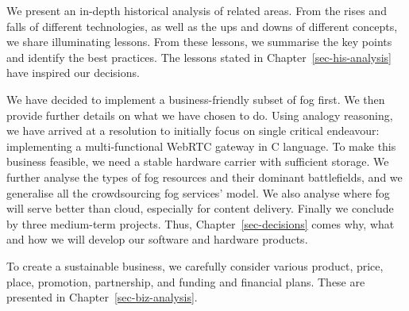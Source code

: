 We present an in-depth historical analysis of related areas. From the rises and falls of different technologies, as well as the ups and downs of different concepts, we share illuminating lessons. From these lessons, we summarise the key points and identify the best practices.   
The lessons stated in Chapter~\ref{sec-his-analysis} have inspired our decisions. 

We have decided to implement a business-friendly subset of fog first. We then provide further details on what we have chosen to do. Using analogy reasoning, we have arrived at a resolution to initially focus on single critical endeavour: implementing a multi-functional WebRTC gateway in C language. To make this business feasible, we need a stable hardware carrier with sufficient storage. We further analyse the types of fog resources and their dominant battlefields, and we generalise all the crowdsourcing fog services' model. We also analyse where fog will serve better than cloud, especially for content delivery. Finally we conclude by three medium-term projects. Thus, Chapter~\ref{sec-decisions} comes why, what and how we will develop our software and hardware products. 

To create a sustainable business, we carefully consider various product, price, place, promotion, partnership, and funding and financial plans. These are presented in Chapter~\ref{sec-biz-analysis}. 
